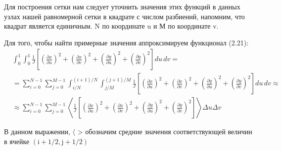 \documentclass[a4paper,14pt,russian]{extreport}
\renewcommand{\_}{\kern-1.5pt\textunderscore\kern-1.5pt}
\begin{document}
Для построения сетки нам следует уточнить значения этих функций в данных узлах нашей равномерной сетки в квадрате с числом разбиений, напомним, что квадрат является единичным. $\mathrm{N}$ по координате u и М по координате v.

Для того, чтобы найти примерные значения аппроксимируем функционал (2.21):
\begin{equation}
\begin{aligned}
& \int_0^1 \int_0^1 \frac{1}{J}\left[\left(\frac{\partial x}{\partial u}\right)^2+\left(\frac{\partial x}{\partial v}\right)^2+\left(\frac{\partial y}{\partial u}\right)^2+\left(\frac{\partial y}{\partial v}\right)^2\right] du\, dv = \\
& = \sum_{i=0}^{N-1} \sum_{j=0}^{M-1} \int_{i/N}^{(i+1)/N} \int_{j/M}^{(j+1)/M} \frac{1}{J}\left[\left(\frac{\partial x}{\partial u}\right)^2+\left(\frac{\partial x}{\partial v}\right)^2+\left(\frac{\partial y}{\partial u}\right)^2+\left(\frac{\partial y}{\partial v}\right)^2\right] du\, dv \approx \\
& \approx \sum_{i=0}^{N-1} \sum_{j=0}^{M-1}\left\langle \frac{1}{J}\left[\left(\frac{\partial x}{\partial u}\right)^2+\left(\frac{\partial x}{\partial v}\right)^2+\left(\frac{\partial y}{\partial u}\right)^2+\left(\frac{\partial y}{\partial v}\right)^2\right]\right\rangle \Delta u \Delta v
\end{aligned}
\end{equation}


В данном выражении, $\langle$ > обозначим средние значения соответствующей величин в ячейке $(\mathrm{i}+1 / 2, \mathrm{j}+1 / 2)$
\end{document}
